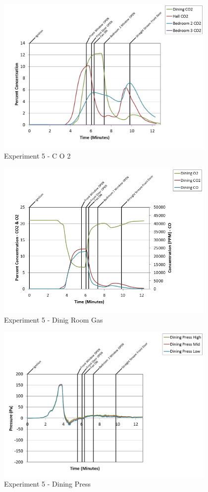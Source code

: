 \documentclass{article}
\begin{document}
\begin{appendices}
\clearpage

\begin{figure}[h!]
	\centering
	\includegraphics[height=3.05in]{0_Images/Results_Charts/Exp_5_Charts/CO2.png}
	\caption{Experiment 5 - C O 2}
\end{figure}


\begin{figure}[h!]
	\centering
	\includegraphics[height=3.05in]{0_Images/Results_Charts/Exp_5_Charts/DinigRoomGas.png}
	\caption{Experiment 5 - Dinig Room Gas}
\end{figure}

\clearpage

\begin{figure}[h!]
	\centering
	\includegraphics[height=3.05in]{0_Images/Results_Charts/Exp_5_Charts/DiningPress.png}
	\caption{Experiment 5 - Dining Press}
\end{figure}



\end{appendices}
\end{document}
